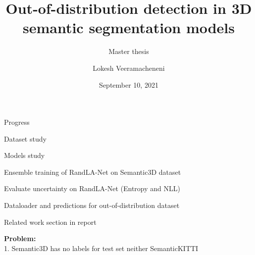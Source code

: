 \documentclass[aspectratio=169]{beamer}
\author[]{Lokesh Veeramacheneni}
\title{Out-of-distribution detection in 3D semantic segmentation models}
\subtitle{Master thesis}
\institute[HBRS]{Hochschule Bonn-Rhein-Sieg}
\date{September 10, 2021}
\newcommand{\cmark}{\ding{51}}%
\newcommand{\done}{\rlap{$\square$}{\raisebox{2pt}{\large\hspace{1pt}\cmark}}%
\hspace{-2.5pt}}
\begin{document}
{
\begin{frame}
\titlepage
\end{frame}
}
\begin{frame}{Progress}
        \begin{todolist}
         \item[\done] Dataset study
         \item[\done] Models study 
         \item Ensemble training of RandLA-Net on Semantic3D dataset
         \item Evaluate uncertainty on RandLA-Net (Entropy and NLL)
         \item Dataloader and predictions for out-of-distribution dataset
         \item Related work section in report
        \end{todolist}
    \textbf{Problem:}
    \\
    1. Semantic3D has no labels for test set neither SemanticKITTI
\end{frame}



\end{document}
